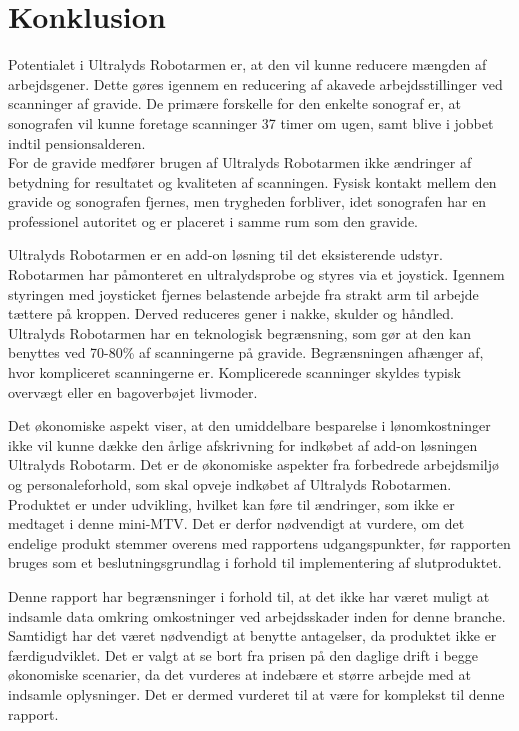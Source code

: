\chapter{Konklusion}
Potentialet i Ultralyds Robotarmen er, at den vil kunne reducere mængden af arbejdsgener. Dette gøres igennem en reducering af akavede arbejdsstillinger ved scanninger af gravide.
De primære forskelle for den enkelte sonograf er, at sonografen vil kunne foretage scanninger 37 timer om ugen, samt blive i jobbet indtil pensionsalderen. \\
For de gravide medfører brugen af Ultralyds Robotarmen ikke ændringer af betydning for resultatet og kvaliteten af scanningen. Fysisk kontakt mellem den gravide og sonografen fjernes, men trygheden forbliver, idet sonografen har en professionel autoritet og er placeret i samme rum som den gravide. 

Ultralyds Robotarmen er en add-on løsning til det eksisterende udstyr. Robotarmen har påmonteret en ultralydsprobe og styres via et joystick. Igennem styringen med joysticket fjernes belastende arbejde fra strakt arm til arbejde tættere på kroppen. Derved reduceres gener i nakke, skulder og håndled. Ultralyds Robotarmen har en teknologisk begrænsning, som gør at den kan benyttes ved 70-80\% af scanningerne på gravide. Begrænsningen afhænger af, hvor kompliceret scanningerne er. Komplicerede scanninger skyldes typisk overvægt eller en bagoverbøjet livmoder. 

Det økonomiske aspekt viser, at den umiddelbare besparelse i lønomkostninger ikke vil kunne dække den årlige afskrivning for indkøbet af add-on løsningen Ultralyds Robotarm. Det er de økonomiske aspekter fra forbedrede arbejdsmiljø og personaleforhold, som skal opveje indkøbet af Ultralyds Robotarmen.\\  
Produktet er under udvikling, hvilket kan føre til ændringer, som ikke er medtaget i denne mini-MTV. Det er derfor nødvendigt at vurdere, om det endelige produkt stemmer overens med rapportens udgangspunkter, før rapporten bruges som et beslutningsgrundlag i forhold til implementering af slutproduktet.

Denne rapport har begrænsninger i forhold til, at det ikke har været muligt at indsamle data omkring omkostninger ved arbejdsskader inden for denne branche. 
Samtidigt har det været nødvendigt at benytte antagelser, da produktet ikke er færdigudviklet. Det er valgt at se bort fra prisen på den daglige drift i begge økonomiske scenarier, da det vurderes at indebære et større arbejde med at indsamle oplysninger. Det er dermed vurderet til at være for komplekst til denne rapport.